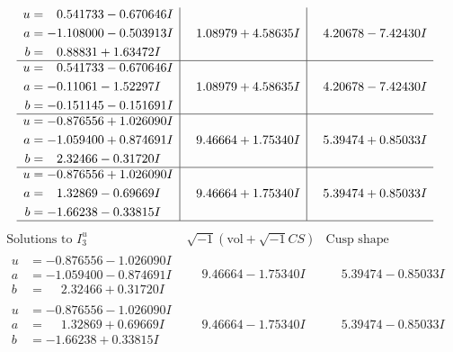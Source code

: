 \documentclass[1p]{elsarticle_modified}
\theoremstyle{definition}
\newcommand{\I}{\sqrt{-1}}
\begin{document}
$$\begin{array}{c|c|c}
\begin{aligned}
u &= \phantom{-}0.541733 - 0.670646 I \\
a &= -1.108000 - 0.503913 I \\
b &= \phantom{-}0.88831 + 1.63472 I\end{aligned}
 & \phantom{-}1.08979 + 4.58635 I & \phantom{-}4.20678 - 7.42430 I \\ \hline\begin{aligned}
u &= \phantom{-}0.541733 - 0.670646 I \\
a &= -0.11061 - 1.52297 I \\
b &= -0.151145 - 0.151691 I\end{aligned}
 & \phantom{-}1.08979 + 4.58635 I & \phantom{-}4.20678 - 7.42430 I \\ \hline\begin{aligned}
u &= -0.876556 + 1.026090 I \\
a &= -1.059400 + 0.874691 I \\
b &= \phantom{-}2.32466 - 0.31720 I\end{aligned}
 & \phantom{-}9.46664 + 1.75340 I & \phantom{-}5.39474 + 0.85033 I \\ \hline\begin{aligned}
u &= -0.876556 + 1.026090 I \\
a &= \phantom{-}1.32869 - 0.69669 I \\
b &= -1.66238 - 0.33815 I\end{aligned}
 & \phantom{-}9.46664 + 1.75340 I & \phantom{-}5.39474 + 0.85033 I\\
 \hline 
 \end{array}$$\newpage$$\begin{array}{c|c|c}  
\text{Solutions to }I^u_{3}& \I (\text{vol} + \sqrt{-1}CS) & \text{Cusp shape}\\
 \hline 
\begin{aligned}
u &= -0.876556 - 1.026090 I \\
a &= -1.059400 - 0.874691 I \\
b &= \phantom{-}2.32466 + 0.31720 I\end{aligned}
 & \phantom{-}9.46664 - 1.75340 I & \phantom{-}5.39474 - 0.85033 I \\ \hline\begin{aligned}
u &= -0.876556 - 1.026090 I \\
a &= \phantom{-}1.32869 + 0.69669 I \\
b &= -1.66238 + 0.33815 I\end{aligned}
 & \phantom{-}9.46664 - 1.75340 I & \phantom{-}5.39474 - 0.85033 I \\ \hline\begin{aligned}

\end{aligned}
\end{array}$$
\end{document}

